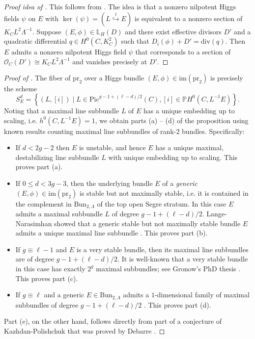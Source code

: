 \documentclass[twoside, 11pt]{article}
\numberwithin{equation}{section}
\theoremstyle{theorem}
\numberwithin{theorem}{section}
\theoremstyle{definition}
\begin{document}
\begin{proof}[Proof idea of ]
This follows from \cite{D24-wobbly}. The idea is that a nonzero nilpotent Higgs fields $\psi$ on $E$ with $\ker(\psi) = (L \overset{i}{\hookrightarrow} E)$ is equivalent to a nonzero section of $K_C L^2 \Lambda^{-1}$. Suppose $(E, \phi) \in \mathbb{L}_H(D)$ and there exist effective divisors $D'$ and a quadratic differential $q \in H^0(C, K_C^2)$ such that $D_i(\phi) + D' = \mathrm{div}(q)$. 
Then $E$ admits a nonzero nilpotent Higgs field $\psi$ that corresponds to a section of $\mathcal{O}_C(D') \cong K_C L^2 \Lambda^{-1}$ and vanishes precisely at $D'$.
\end{proof}

\begin{proof}[Proof of ]
The fiber of $\mathrm{pr}_2$ over a Higgs bundle $(E, \phi) \in \mathrm{im}(\mathrm{pr}_2)$ is precisely the scheme 
\[ S_E^d = \left\{ (L, [i]) \mid L \in \mathrm{Pic}^{g-1+(\ell -d)/2}(C), [i] \in \mathbb{P}H^0(C, L^{-1} E) \right\}. \] 
Noting that a maximal line subbundle $L$ of $E$ has a unique embedding up to scaling, i.e. $h^0(C, L^{-1} E) = 1$, we obtain parts (a) -- (d) of the proposition using known results counting maximal line subbundles of rank-2 bundles.
Specifically:
\begin{itemize}
\item If $d < 2g-2$ then $E$ is unstable, and hence $E$ has a unique maximal, destabilizing line subbundle $L$ with unique embedding up to scaling. This proves part (a). 
\item If $0 \leq d < 3g-3$, then the underlying bundle $E$ of a \textit{generic} $(E, \phi) \in \mathrm{im}(\mathrm{pr}_2)$ is stable but not maximally stable, i.e. it is contained in the complement in $\mathrm{Bun}_{2, \Lambda}$ of the top open Segre stratum. In this case $E$ admits a maximal subbundle $L$ of degree $g-1+(\ell -d)/2$. Lange-Narasimhan showed that a generic stable but not maximally stable bundle $E$ admits a unique maximal line subbundle \cite{LN83}. This proves part (b).
\item If $g \equiv \ell -1$ and $E$ is a very stable bundle, then its maximal line subbundles are of degree $g-1+(\ell -d)/2$. It is well-known that a very stable bundle in this case has exactly $2^g$ maximal subbundles; see Gronow's PhD thesis \cite{Gronow97}. This proves part (c).
\item If $g \equiv \ell$ and a generic $E \in \mathrm{Bun}_{2, \Lambda}$ admits a $1$-dimensional family of maximal subbundles of degree $g-1+(\ell -d)/2$ \cite{LN83}. This proves part (d).
\end{itemize}
Part (e), on the other hand, follows directly from part of a conjecture of Kazhdan-Polishchuk \cite{BravermanKazhdan2023, KazhdanPolishchuk2024} that was proved by Debarre \cite{Debarre2024}.
\end{proof}
\end{document}
